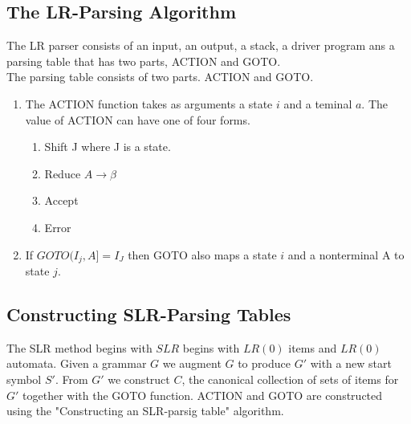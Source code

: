 \subsection{The LR-Parsing Algorithm}
The LR parser consists of an input, an output, a stack, a driver program ans a parsing table that has two parts, ACTION and GOTO. \\ 
The parsing table consists of two parts. ACTION and GOTO. 
\begin{enumerate}
	\item{The ACTION function takes as arguments a state $i$ and a teminal $a$. The value of ACTION can have one of four forms.}
	\begin{enumerate}
		\item{Shift J where J is a state.}
		\item{Reduce $A \rightarrow \beta$} 
		\item{Accept}
		\item{Error} 
	\end{enumerate}
	\item{If $GOTO(I_j, A] = I_J$ then GOTO also maps a state $i$ and a nonterminal A to state $j$.}
\end{enumerate}

\subsection{Constructing SLR-Parsing Tables}
The SLR method begins with $SLR$ begins with $LR(0)$ items and $LR(0)$ automata. Given a grammar $G$ we augment $G$ to produce $G'$ with a new start symbol $S'$. From $G'$ we construct $C$, the canonical collection of sets of items for $G'$ together with the GOTO function. ACTION and GOTO are constructed using the "Constructing an SLR-parsig table" algorithm.
